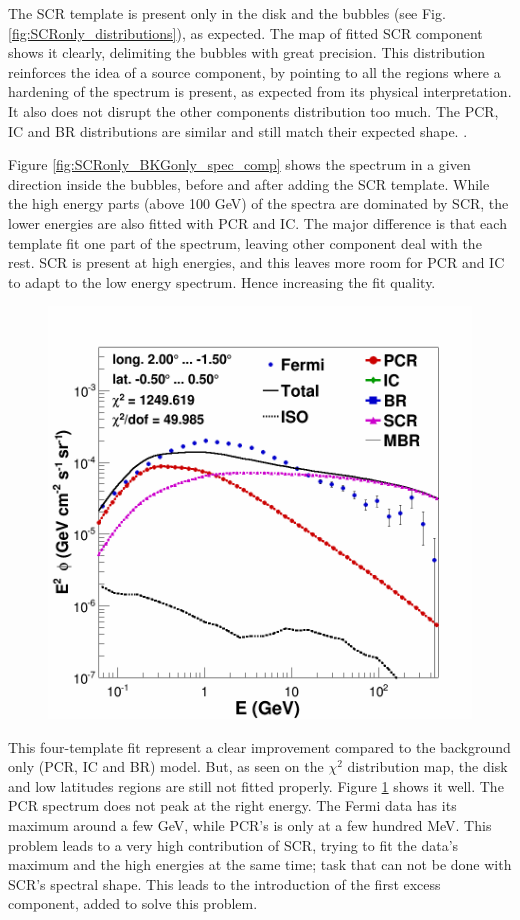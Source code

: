 The SCR template is present only in the disk and the bubbles (see Fig. \ref{fig:SCRonly_distributions}), as expected. The map of fitted SCR component shows it clearly, delimiting the bubbles with great precision. This distribution reinforces the idea of a source component, by pointing to all the regions where a hardening of the spectrum is present, as expected from its physical interpretation.
It also does not disrupt the other components distribution too much. The PCR, IC and BR distributions are similar and still match their expected shape. .

Figure \ref{fig:SCRonly_BKGonly_spec_comp} shows the spectrum in a given direction inside the bubbles, before and after adding the SCR template. While the high energy parts (above 100 GeV) of the spectra are dominated by SCR, the lower energies are also fitted with PCR and IC. The major difference is that each template fit one part of the spectrum, leaving other component deal with the rest. SCR is present at high energies, and this leaves more room for PCR and IC to adapt to the low energy spectrum. Hence increasing the fit quality.



\begin{figure}[h]
	\centering
	\includegraphics[width=.5\linewidth]{pic/results/SCRonly_CMZ.png}
	\label{fig:SCRonly_CMZ_spec}
\end{figure}

This four-template fit represent a clear improvement compared to the background only (PCR, IC and BR) model. But, as seen on the $\chi^2$ distribution map, the disk and low latitudes regions are still not fitted properly. Figure \ref{fig:SCRonly_CMZ_spec} shows it well. The PCR spectrum does not peak at the right energy. The Fermi data has its maximum around a few GeV, while PCR's is only at a few hundred MeV. This problem leads to a very high contribution of SCR, trying to fit the data's maximum and the high energies at the same time; task that can not be done with SCR's spectral shape.
This leads to the introduction of the first excess component, added to solve this problem.





